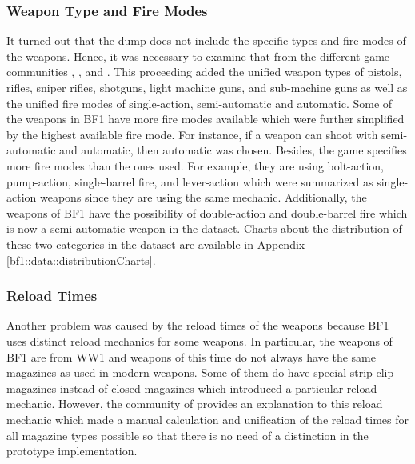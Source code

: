 \documentclass[MGS,Master,english]{twbook}%
\begin{document}
\subsubsection{Weapon Type and Fire Modes}
It turned out that the dump does not include the specific types and fire modes of the weapons. Hence, it was necessary to examine that from the different game communities \citep{symthic::bf1stats}, \citep{bf1::community1}, and \citep{bf1::community2}. This proceeding added the unified weapon types of pistols, rifles, sniper rifles, shotguns, light machine guns, and sub-machine guns as well as the unified fire modes of single-action, semi-automatic and automatic. Some of the weapons in \ac{BF1} have more fire modes available which were further simplified by the highest available fire mode. For instance, if a weapon can shoot with semi-automatic and automatic, then automatic was chosen. Besides, the game specifies more fire modes than the ones used. For example, they are using bolt-action, pump-action, single-barrel fire, and lever-action which were summarized as single-action weapons since they are using the same mechanic. Additionally, the weapons of \ac{BF1} have the possibility of double-action and double-barrel fire which is now a semi-automatic weapon in the dataset. Charts about the distribution of these two categories in the dataset are available in Appendix \ref{bf1::data::distributionCharts}. 

\subsubsection{Reload Times}
Another problem was caused by the reload times of the weapons because \ac{BF1} uses distinct reload mechanics for some weapons. In particular, the weapons of \ac{BF1} are from \ac{WW1} and weapons of this time do not always have the same magazines as used in modern weapons. Some of them do have special strip clip magazines instead of closed magazines which introduced  a particular reload mechanic. However, the community of \citep{symthic::bf1stats} provides an explanation to this reload mechanic which made a manual calculation and unification of the reload times for all magazine types possible so that there is no need of a distinction in the prototype implementation.
\end{document}
